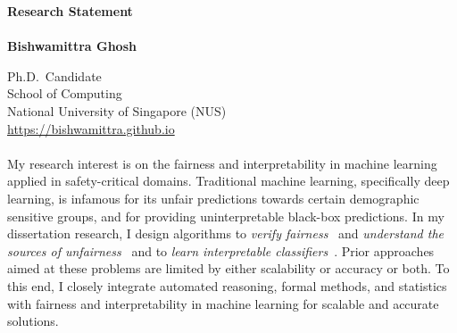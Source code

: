 \documentclass[11pt]{article}
\newcommand{\blue}[1]{\textcolor{blue}{#1}}
\begin{document}
	\noindent\huge \textbf{Research Statement} \\
	\vspace{0.1em}\\
	\Large \textbf{Bishwamittra Ghosh}
		
	\normalsize
	\noindent Ph.D.\ Candidate\\
	School of Computing\\
	National University of Singapore (NUS)\\
	\blue{\url{https://bishwamittra.github.io}}



	\paragraph{}
	My research interest is on the fairness and interpretability in machine learning applied in safety-critical domains. Traditional machine learning, specifically deep learning, is infamous for its unfair predictions towards certain demographic sensitive groups, and for providing uninterpretable black-box predictions. In my dissertation research, I design algorithms to \textit{verify fairness}~\cite{ghosh2021justicia,ghosh2022algorithmic} and \textit{understand the sources of unfairness}~\cite{ghosh2022how} and to \textit{learn interpretable classifiers}~\cite{ghosh22efficient,ghosh2019incremental,ghosh2020classification}. Prior approaches aimed at these problems are limited by either scalability or accuracy or both. To this end, I closely integrate automated reasoning, formal methods, and statistics with fairness and interpretability in machine learning for scalable and accurate solutions.
	
	
	
	
\end{document}
